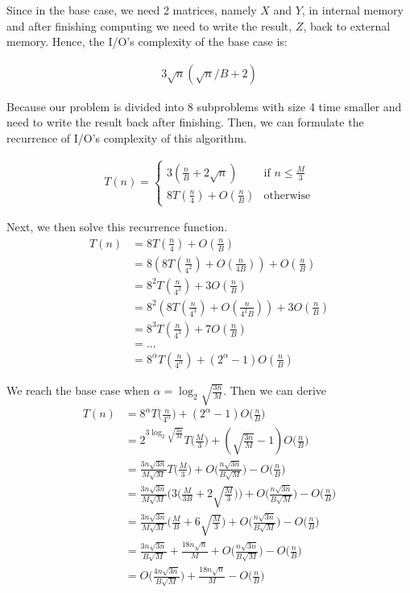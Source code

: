 Since in the base case, we need 2 matrices, namely $X$ and $Y$, in internal memory and after finishing computing
we need to write the result, $Z$, back to external memory. Hence, the I/O's complexity of the base case is:

\begin{align*}
    3\sqrt{n}(\sqrt{n}/B + 2)
\end{align*}

Because our problem is divided into $8$ subproblems with size 4 time smaller and need to write the result back after finishing.
Then, we can formulate the recurrence of I/O's complexity of this algorithm.

\begin{align*}
	T(n) = \begin{cases}
	    3( \frac{n}{B} + 2\sqrt{n} ) & \text{if } n \leq \frac{M}{3}\\
	    8T(\frac{n}{4}) + O(\frac{n}{B})              & \text{otherwise}
	\end{cases}
\end{align*}

Next, we then solve this recurrence function.
\begin{align*}
T(n) &= 8T(\frac{n}{4}) + O(\frac{n}{B}) \\
&= 8( 8T(\frac{n}{4^2}) + O(\frac{n}{4B}) ) + O(\frac{n}{B}) \\
&= 8^2T(\frac{n}{4^2}) + 3O(\frac{n}{B}) \\
&= 8^2( 8T(\frac{n}{4^3}) + O(\frac{n}{4^2B}) ) + 3O(\frac{n}{B}) \\
&= 8^3T(\frac{n}{4^3}) + 7O(\frac{n}{B}) \\
&= ... \\
&= 8^{\alpha}T(\frac{n}{4^\alpha}) + ( 2^\alpha - 1 )O(\frac{n}{B})
\end{align*}

We reach the base case when $\alpha = \log_2{ \sqrt{ \frac{3n}{M} }}$. Then we can derive
\begin{align*}
T(n) &= 8^{\alpha}T\Big(\frac{n}{4^\alpha}\Big) + ( 2^{\alpha} - 1 )O\Big(\frac{n}{B}\Big) \\
&= 2^{3\log_2{ \sqrt{ \frac{3n}{M} }}} T\Big( \frac{M}{3} \Big) + ( \sqrt{ \frac{3n}{M} } - 1 )O\Big(\frac{n}{B}\Big) \\
&= \frac{3n\sqrt{3n}}{M\sqrt{M}} T\Big( \frac{M}{3} \Big) + O\Big(\frac{n\sqrt{3n}}{B\sqrt{M}}\Big) - O\Big(\frac{n}{B}\Big)\\
&= \frac{3n\sqrt{3n}}{M\sqrt{M}} \Big( 3 \Big(\frac{M}{3B} + 2\sqrt{\frac{M}{3}}\Big)\Big) + O\Big(\frac{n\sqrt{3n}}{B\sqrt{M}}\Big)- O\Big(\frac{n}{B}\Big) \\
&= \frac{3n\sqrt{3n}}{M\sqrt{M}} \Big( \frac{M}{B} + 6\sqrt{\frac{M}{3}}\Big) + O\Big(\frac{n\sqrt{3n}}{B\sqrt{M}}\Big)- O\Big(\frac{n}{B}\Big) \\
&= \frac{3n\sqrt{3n}}{B\sqrt{M}} + \frac{18n\sqrt{n}}{M} + O\Big(\frac{n\sqrt{3n}}{B\sqrt{M}}\Big)- O\Big(\frac{n}{B}\Big) \\
&= O\Big(\frac{4n\sqrt{3n}}{B\sqrt{M}}\Big) + \frac{18n\sqrt{n}}{M} - O\Big(\frac{n}{B}\Big)
\end{align*}

